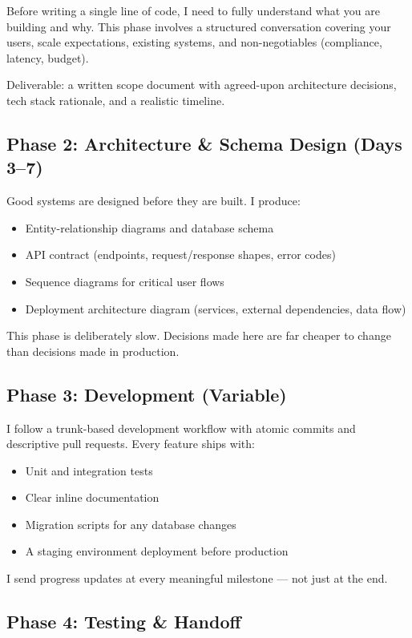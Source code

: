 \documentclass[11pt,a4paper]{article}
\begin{document}
Before writing a single line of code, I need to fully understand what you are building and why. This phase involves a structured conversation covering your users, scale expectations, existing systems, and non-negotiables (compliance, latency, budget).

Deliverable: a written scope document with agreed-upon architecture decisions, tech stack rationale, and a realistic timeline.

\subsection{Phase 2: Architecture \& Schema Design (Days 3--7)}

Good systems are designed before they are built. I produce:
\begin{itemize}
  \item Entity-relationship diagrams and database schema
  \item API contract (endpoints, request/response shapes, error codes)
  \item Sequence diagrams for critical user flows
  \item Deployment architecture diagram (services, external dependencies, data flow)
\end{itemize}

This phase is deliberately slow. Decisions made here are far cheaper to change than decisions made in production.

\subsection{Phase 3: Development (Variable)}

I follow a trunk-based development workflow with atomic commits and descriptive pull requests. Every feature ships with:
\begin{itemize}
  \item Unit and integration tests
  \item Clear inline documentation
  \item Migration scripts for any database changes
  \item A staging environment deployment before production
\end{itemize}

I send progress updates at every meaningful milestone — not just at the end.

\subsection{Phase 4: Testing \& Handoff}
\end{document}
